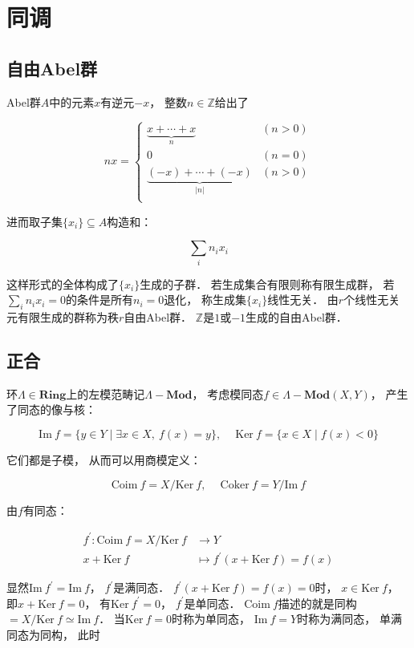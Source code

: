 \chapter{同调}

\section{自由Abel群}

Abel群$A$中的元素$x$有逆元$-x$，
整数$n \in \mathbb Z$给出了

$$
nx = \begin{cases}
  \underbrace{x + \cdots + x}_n & (n > 0) \\
  0 & (n = 0) \\
  \underbrace{(-x) + \cdots + (-x)}_{|n|} & (n > 0) \\
\end{cases}
$$

进而取子集$\{x_i\} \subseteq A$构造和：

$$
\sum_i n_i x_i
$$

这样形式的全体构成了$\{x_i\}$生成的子群．
若生成集合有限则称有限生成群，
若$\sum_i n_i x_i = 0$的条件是所有$n_i = 0$退化，
称生成集$\{x_i\}$线性无关．
由$r$个线性无关元有限生成的群称为秩$r$自由Abel群．
$\mathbb Z$是$1$或$-1$生成的自由Abel群．


\section{正合}

环$\Lambda \in \textbf{Ring}$上的左模范畴记$\Lambda-\textbf{Mod}$，
考虑模同态$f \in \Lambda-\textbf{Mod}(X,Y)$，
产生了同态的像与核：

$$
\text{Im} \ f = \{ y \in Y \mid \exists x \in X,\ f(x) = y\},\ 
\quad
\text{Ker} \ f = \{x\in X \mid f(x) < 0\}
$$

它们都是子模，
从而可以用商模定义：

$$
\text{Coim} \ f = X/\text{Ker} \ f,\ 
\quad
\text{Coker} \ f = Y/\text{Im} \ f
$$

由$f$有同态：

$$
\begin{aligned}
  f^\prime : \text{Coim} \ f = X/\text{Ker} \ f &\to Y \\
  x + \text{Ker} \ f &\mapsto f^\prime(x + \text{Ker} \ f) = f(x)
\end{aligned}
$$

显然$\text{Im} \ f^\prime = \text{Im} \ f$，
$f^\prime$是满同态．
$f^\prime(x + \text{Ker} \ f) = f(x) = 0$时，
$x \in \text{Ker} \ f$，
即$x + \text{Ker} \ f = 0$，
有$\text{Ker} \ f^\prime = 0$，
$f^\prime$是单同态．
$\text{Coim} \ f$描述的就是同构$ = X/\text{Ker} \ f \simeq \text{Im} \ f$．
当$\text{Ker} \ f = 0$时称为单同态，
$\text{Im} \ f = Y$时称为满同态，
单满同态为同构，
此时

